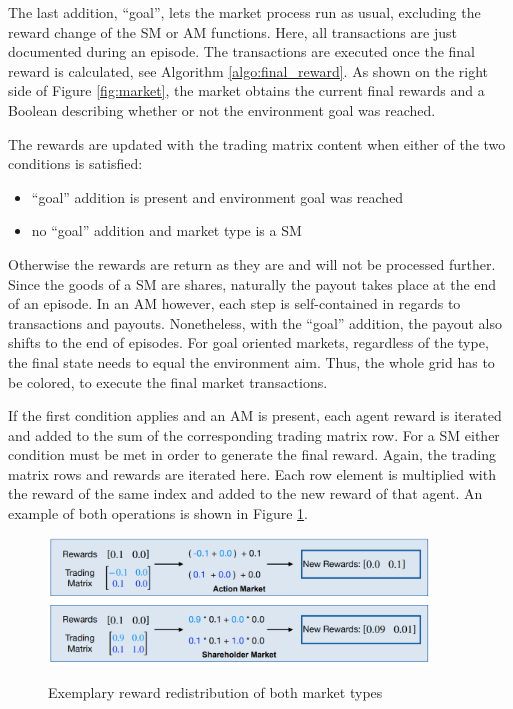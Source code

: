 The last addition, ``goal'', lets the market process run as usual, excluding the reward change of the SM or AM functions. Here, all transactions are just documented during an episode. The transactions are executed once the final reward is calculated, see Algorithm \ref{algo:final_reward}. As shown on the right side of Figure \ref{fig:market}, the market obtains the current final rewards and a Boolean describing whether or not the environment goal was reached.

The rewards are updated with the trading matrix content when either of the two conditions is satisfied:
\begin{itemize}
    \item ``goal'' addition is present and environment goal was reached
    \item no ``goal'' addition and market type is a SM
\end{itemize}
Otherwise the rewards are return as they are and will not be processed further. Since the goods of a SM are shares, naturally the payout takes place at the end of an episode. In an AM however, each step is self-contained in regards to transactions and payouts. Nonetheless, with the ``goal'' addition, the payout also shifts to the end of episodes. For goal oriented markets, regardless of the type, the final state needs to equal the environment aim. Thus, the whole grid has to be colored, to execute the final market transactions.

If the first condition applies and an AM is present, each agent reward is iterated and added to the sum of the corresponding trading matrix row. For a SM either condition must be met in order to generate the final reward. Again, the trading matrix rows and rewards are iterated here. Each row element is multiplied with the reward of the same index and added to the new reward of that agent. An example of both operations is shown in Figure \ref{fig:market_rewards}.

\begin{figure}[hpbt]
    \centering
    \includegraphics[width=0.9\textwidth]{pictures/market_rewards}\\
    \caption[Exemplary Reward Redistribution Of Markets]{Exemplary reward redistribution of both market types}\label{fig:market_rewards}
\end{figure}

